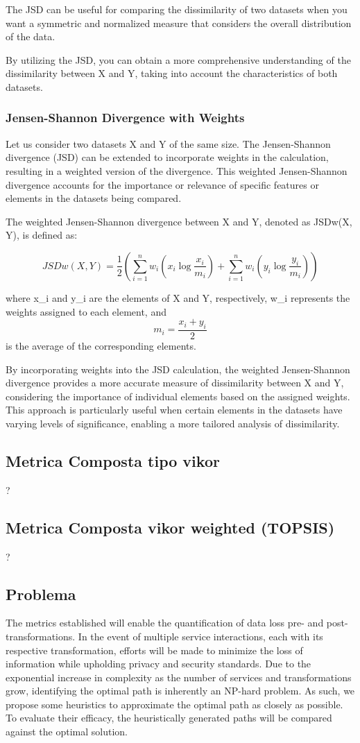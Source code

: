 The JSD can be useful for comparing the dissimilarity of two datasets when you want a symmetric and normalized measure that considers the overall distribution of the data.

By utilizing the JSD, you can obtain a more comprehensive understanding of the dissimilarity between X and Y, taking into account the characteristics of both datasets.

\subsubsection{Jensen-Shannon Divergence with Weights}

Let us consider two datasets X and Y of the same size. The Jensen-Shannon divergence (JSD) can be extended to incorporate weights in the calculation, resulting in a weighted version of the divergence. This weighted Jensen-Shannon divergence accounts for the importance or relevance of specific features or elements in the datasets being compared.

The weighted Jensen-Shannon divergence between X and Y, denoted as JSDw(X, Y), is defined as:

\[JSDw(X, Y) = \frac{1}{2} \left( \sum_{i=1}^{n} w_i \left( x_i \log \frac{x_i}{m_i} \right) + \sum_{i=1}^{n} w_i \left( y_i \log \frac{y_i}{m_i} \right) \right)\]

where x\_i and y\_i are the elements of X and Y, respectively, w\_i represents the weights assigned to each element, and \[m_i = \frac{{x_i + y_i}}{2}\] is the average of the corresponding elements.

By incorporating weights into the JSD calculation, the weighted Jensen-Shannon divergence provides a more accurate measure of dissimilarity between X and Y, considering the importance of individual elements based on the assigned weights. This approach is particularly useful when certain elements in the datasets have varying levels of significance, enabling a more tailored analysis of dissimilarity.
\subsection{Metrica Composta tipo vikor}
?
\subsection{Metrica Composta vikor weighted (TOPSIS)}
?

\subsection{Problema}
The metrics established will enable the quantification of data loss pre- and post-transformations.
In the event of multiple service interactions, each with its respective transformation, efforts will be made to minimize the loss of information while upholding privacy and security standards.
Due to the exponential increase in complexity as the number of services and transformations grow, identifying the optimal path is inherently an NP-hard problem.
As such, we propose some heuristics to approximate the optimal path as closely as possible. To evaluate their efficacy, the heuristically generated paths will be compared against the optimal solution.
